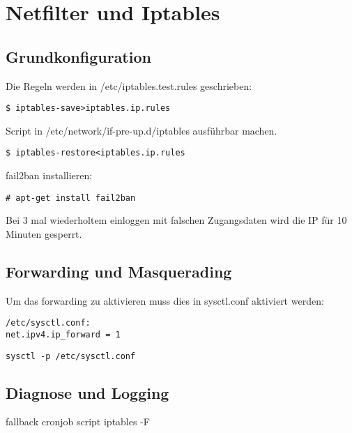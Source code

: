 \chapter{Netfilter und Iptables}
\section{Grundkonfiguration}
Die Regeln werden in /etc/iptables.test.rules geschrieben:

\begin{lstlisting}[style=Bash]
$ iptables-save>iptables.ip.rules
\end{lstlisting}
Script in /etc/network/if-pre-up.d/iptables ausführbar machen.\\

\begin{lstlisting}[style=Bash]
$ iptables-restore<iptables.ip.rules
\end{lstlisting}
fail2ban installieren:
\begin{lstlisting}[style=Bash]
# apt-get install fail2ban
\end{lstlisting}
Bei 3 mal wiederholtem einloggen mit falschen Zugangsdaten wird die IP für 10 Minuten gesperrt.
\section{Forwarding und Masquerading}
Um das forwarding zu aktivieren muss dies in sysctl.conf aktiviert werden:
\begin{lstlisting}[style=Bash]
/etc/sysctl.conf:
net.ipv4.ip_forward = 1
\end{lstlisting}
\begin{lstlisting}[style=Bash]
sysctl -p /etc/sysctl.conf
\end{lstlisting}
\section{Diagnose und Logging}
fallback cronjob script iptables -F
